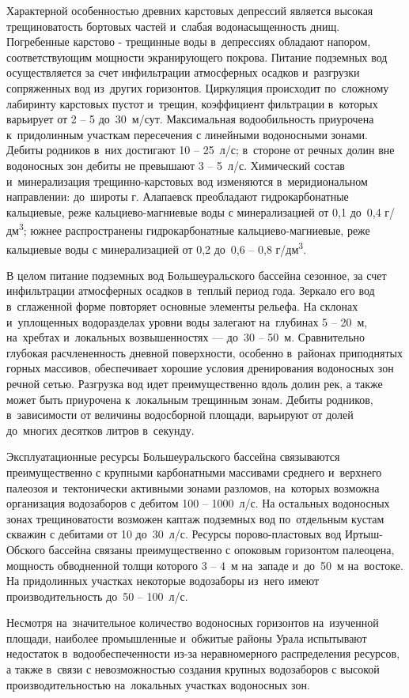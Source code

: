 Характерной особенностью древних карстовых депрессий является высокая трещиноватость бортовых частей и~слабая водонасыщенность днищ. Погребенные карстово - трещинные воды в~депрессиях обладают напором, соответствующим мощности экранирующего покрова. Питание подземных вод осуществляется за счет инфильтрации атмосферных осадков и~разгрузки сопряженных вод из~других горизонтов. Циркуляция происходит по~сложному лабиринту карстовых пустот и~трещин, коэффициент фильтрации в~которых варьирует от 2  --  5 до~30~м/сут. Максимальная водообильность приурочена к~придолинным участкам пересечения с линейными водоносными зонами. Дебиты родников в~них достигают 10  --  25~л/с; в~стороне от речных долин вне водоносных зон дебиты не превышают 3  --  5~л/с. Химический состав и~минерализация трещинно-карстовых вод изменяются в~меридиональном направлении: до~широты г. Алапаевск преобладают гидрокарбонатные кальциевые, реже кальциево-магниевые воды с минерализацией от 0,1 до~0,4 г/дм\textsuperscript{3}; южнее распространены гидрокарбонатные кальциево-магниевые, реже кальциевые воды с минерализацией от 0,2 до~0,6 -- 0,8 г/дм\textsuperscript{3}.

В целом питание подземных вод Большеуральского бассейна сезонное, за счет инфильтрации атмосферных осадков в~теплый период года. Зеркало его вод в~сглаженной форме повторяет основные элементы рельефа. На склонах и~уплощенных водоразделах уровни воды залегают на~глубинах 5  --  20~м, на~хребтах и~локальных возвышенностях  ---  до~30  --  50~м. Сравнительно глубокая расчлененность дневной поверхности, особенно в~районах приподнятых горных массивов, обеспечивает хорошие условия дренирования водоносных зон речной сетью. Разгрузка вод идет преимущественно вдоль долин рек, а также может быть приурочена к~локальным трещинным зонам. Дебиты родников, в~зависимости от величины водосборной площади, варьируют от долей до~многих десятков литров в~секунду.

Эксплуатационные ресурсы Большеуральского бассейна связываются преимущественно с крупными карбонатными массивами среднего и~верхнего палеозоя и~тектонически активными зонами разломов, на~которых возможна организация водозаборов с дебитом 100  --  1000~л/с. На остальных водоносных зонах трещиноватости возможен каптаж подземных вод по~отдельным кустам скважин с дебитами от 10 до~30~л/с. Ресурсы порово-пластовых вод Иртыш-Обского бассейна связаны преимущественно с опоковым горизонтом палеоцена, мощность обводненной толщи которого 3  --  4~м на~западе и~до~50~м на~востоке. На придолинных участках некоторые водозаборы из~него имеют производительность до~50 -- 100~л/с.

Несмотря на~значительное количество водоносных горизонтов на~изученной площади, наиболее промышленные и~обжитые районы Урала испытывают недостаток в~водообеспеченности из-за неравномерного распределения ресурсов, а также в~связи с невозможностью создания крупных водозаборов с высокой производительностью на~локальных участках водоносных зон.
